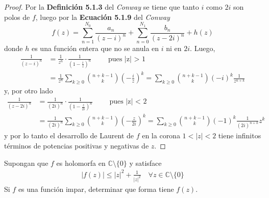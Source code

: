 \documentclass{article}
\newcommand{\C}{\mathbb{C}}
\newenvironment{theorem}[2][Ejercicio]{\begin{trivlist}
\item[\hskip\labelsep{\bfseries #1}\hskip\labelsep{\bfseries #2.}]}{\end{trivlist}}
\begin{document}
\begin{proof}
    Por la \textbf{Definición 5.1.3} del \emph{Conway} se tiene que tanto \( i \) como \( 2i \) son polos de \( f \), luego por la \textbf{Ecuación 5.1.9} del \emph{Conway} \[
        f(z) = \sum_{n = 1}^{N_0} \frac{a_n}{{(z-i)}^n} + \sum_{n = 0}^{N_1} \frac{b_n}{{(z - 2i)}^n} + h(z)
    \]
    donde \( h \) es una función entera que no se anula en \( i \) ni en \( 2i \). Luego, \begin{align*}
        \frac{1}{{(z-i)}^n} & = \frac{1}{z^n} \cdot \frac{1}{{\left(1 - \frac{i}{z} \right)}^n} \qquad \text{ pues |z| > 1}                                                      \\
                            & = \frac{1}{z^n} \sum_{k \geq 0} \binom{n + k - 1}{k} {\left( -\frac{i}{z} \right)}^k = \sum_{k \geq 0} \binom{n+k-1}{k} {(-i)}^k \frac{1}{z^{n+k}}
    \end{align*}
    y, por otro lado \begin{align*}
        \frac{1}{{(z-2i)}^n} & = \frac{1}{{(2i)}^n} \cdot \frac{1}{{\left( 1 - \frac{z}{2i} \right)}^n} \qquad \text{ pues |z| < 2}                                                          \\
                             & = \frac{1}{{(2i)}^n} \sum_{k \geq 0} \binom{n+k-1}{k} {\left( -\frac{z}{2i} \right)}^k = \sum_{k \geq 0} \binom{n+k-1}{k} {(-1)}^k \frac{1}{{(2i)}^{n+k}} z^k
    \end{align*}
    y por lo tanto el desarrollo de Laurent de \( f \) en la corona \( 1 < |z| < 2 \) tiene infinitos términos de potencias positivas y negativas de \( z \).
\end{proof}

\vspace{0.25in}

\begin{theorem}{13}
    Supongan que \( f \) es holomorfa en \( \C \setminus \{ 0 \} \) y satisface \begin{align*}
        |f(z)| \leq |z|^2 + \frac{1}{|z|^2} \quad \forall z \in \C \setminus \{ 0 \}
    \end{align*}
    Si \( f \) es una función impar, determinar que forma tiene \( f(z) \).
\end{theorem}
\end{document}

